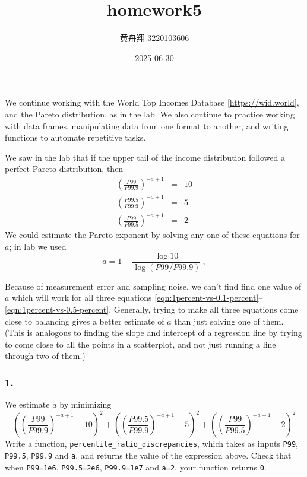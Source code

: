 \documentclass[
]{article}
\title{homework5}
\author{黄舟翔 3220103606}
\date{2025-06-30}
\begin{document}
\maketitle

We continue working with the World Top Incomes Database
{[}\url{https://wid.world}{]}, and the Pareto distribution, as in the
lab. We also continue to practice working with data frames, manipulating
data from one format to another, and writing functions to automate
repetitive tasks.

We saw in the lab that if the upper tail of the income distribution
followed a perfect Pareto distribution, then \begin{eqnarray}
\label{eqn:1percent-vs-0.1-percent}
\left(\frac{P99}{P99.9}\right)^{-a+1}  & = & 10\\
\left(\frac{P99.5}{P99.9}\right)^{-a+1} & = & 5\\
\left(\frac{P99}{P99.5}\right)^{-a+1} & = & 2
\label{eqn:1percent-vs-0.5-percent}
\end{eqnarray} We could estimate the Pareto exponent by solving any one
of these equations for \(a\); in lab we used \begin{equation}
a = 1 - \frac{\log{10}}{\log{(P99/P99.9)}} ~,
\label{eqn:exponent-from-quantile-ratio}
\end{equation}

Because of measurement error and sampling noise, we can't find find one
value of \(a\) which will work for all three equations
\eqref{eqn:1percent-vs-0.1-percent}--\eqref{eqn:1percent-vs-0.5-percent}.
Generally, trying to make all three equations come close to balancing
gives a better estimate of \(a\) than just solving one of them. (This is
analogous to finding the slope and intercept of a regression line by
trying to come close to all the points in a scatterplot, and not just
running a line through two of them.)

\subsubsection{1.}\label{section}

We estimate \(a\) by minimizing \[
\left(\left(\frac{P99}{P99.9}\right)^{-a+1} - 10\right)^2 + \left(\left(\frac{P99.5}{P99.9}\right)^{-a+1} - 5\right)^2 +  \left(\left(\frac{P99}{P99.5}\right)^{-a+1} - 2\right)^2
\] Write a function, \texttt{percentile\_ratio\_discrepancies}, which
takes as inputs \texttt{P99}, \texttt{P99.5}, \texttt{P99.9} and
\texttt{a}, and returns the value of the expression above. Check that
when \texttt{P99=1e6}, \texttt{P99.5=2e6}, \texttt{P99.9=1e7} and
\texttt{a=2}, your function returns \texttt{0}.
\end{document}
